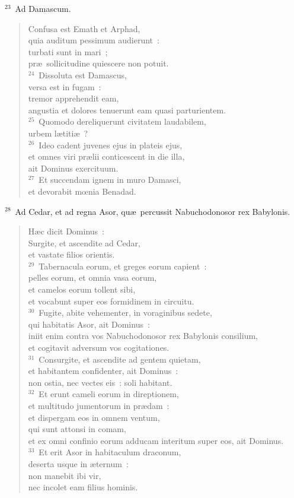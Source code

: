 ${}^{23}$~Ad Damascum. \begin{verse}Confusa est Emath et Arphad,\\ quia auditum pessimum audierunt~:\\ turbati sunt in mari~;\\ pr\ae\ sollicitudine quiescere non potuit.\\
${}^{24}$~Dissoluta est Damascus,\\ versa est in fugam~:\\ tremor apprehendit eam,\\ angustia et dolores tenuerunt eam quasi parturientem.\\
${}^{25}$~Quomodo dereliquerunt civitatem laudabilem,\\ urbem l\ae titi\ae~?\\
${}^{26}$~Ideo cadent juvenes ejus in plateis ejus,\\ et omnes viri pr\ae lii conticescent in die illa,\\ ait Dominus exercituum.\\
${}^{27}$~Et succendam ignem in muro Damasci,\\ et devorabit mœnia Benadad.\end{verse}


${}^{28}$~Ad Cedar, et ad regna Asor, qu\ae\ percussit Nabuchodonosor rex Babylonis. \begin{verse}H\ae c dicit Dominus~:\\ Surgite, et ascendite ad Cedar,\\ et vastate filios orientis.\\
${}^{29}$~Tabernacula eorum, et greges eorum capient~:\\ pelles eorum, et omnia vasa eorum,\\ et camelos eorum tollent sibi,\\ et vocabunt super eos formidinem in circuitu.\\
${}^{30}$~Fugite, abite vehementer, in voraginibus sedete,\\ qui habitatis Asor, ait Dominus~:\\ iniit enim contra vos Nabuchodonosor rex Babylonis consilium,\\ et cogitavit adversum vos cogitationes.\\
${}^{31}$~Consurgite, et ascendite ad gentem quietam,\\ et habitantem confidenter, ait Dominus~:\\ non ostia, nec vectes eis~: soli habitant.\\
${}^{32}$~Et erunt cameli eorum in direptionem,\\ et multitudo jumentorum in pr\ae dam~:\\ et dispergam eos in omnem ventum,\\ qui sunt attonsi in comam,\\ et ex omni confinio eorum adducam interitum super eos, ait Dominus.\\
${}^{33}$~Et erit Asor in habitaculum draconum,\\ deserta usque in \ae ternum~:\\ non manebit ibi vir,\\ nec incolet eam filius hominis.\end{verse}


